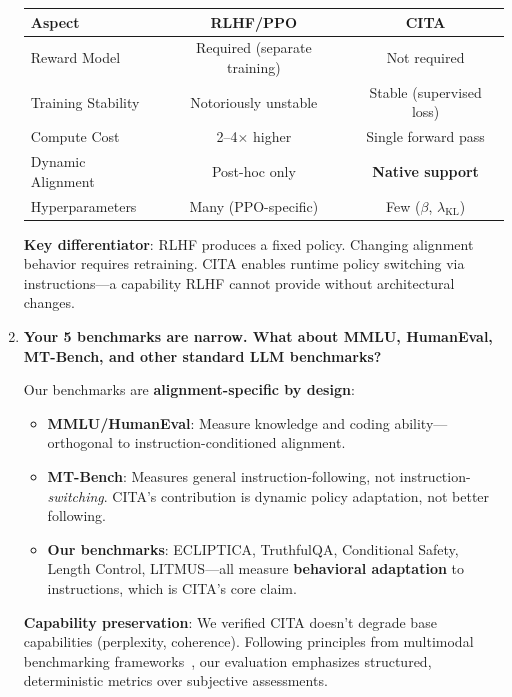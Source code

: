 \begin{enumerate}[label=\textbf{Q\arabic*.}, leftmargin=*, itemsep=8pt]
\begin{table}[ht!]
\centering
\small
\renewcommand{\arraystretch}{1.2}
\begin{tabular}{@{}lcc@{}}
\toprule
\textbf{Aspect} & \textbf{RLHF/PPO} & \textbf{CITA} \\
\midrule
Reward Model & Required (separate training) & Not required \\ \hline
Training Stability & Notoriously unstable & Stable (supervised loss) \\ \hline
Compute Cost & 2--4$\times$ higher & Single forward pass \\ \hline
Dynamic Alignment & Post-hoc only & \textbf{Native support} \\ \hline
Hyperparameters & Many (PPO-specific) & Few ($\beta$, $\lambda_{\text{KL}}$) \\
\bottomrule
\end{tabular}
\end{table}

\textbf{Key differentiator}: RLHF produces a fixed policy. Changing alignment behavior requires retraining. CITA enables runtime policy switching via instructions---a capability RLHF cannot provide without architectural changes.

\vspace{4mm}

\item \textbf{Your 5 benchmarks are narrow. What about MMLU, HumanEval, MT-Bench, and other standard LLM benchmarks?}

 Our benchmarks are \textbf{alignment-specific by design}:

\begin{itemize}[leftmargin=*,itemsep=2pt]
    \item \textbf{MMLU/HumanEval}: Measure knowledge and coding ability---orthogonal to instruction-conditioned alignment.

    \item \textbf{MT-Bench}: Measures general instruction-following, not instruction-\textit{switching}. CITA's contribution is dynamic policy adaptation, not better following.

    \item \textbf{Our benchmarks}: ECLIPTICA, TruthfulQA, Conditional Safety, Length Control, LITMUS---all measure \textbf{behavioral adaptation} to instructions, which is CITA's core claim.
\end{itemize}

\textbf{Capability preservation}: We verified CITA doesn't degrade base capabilities (perplexity, coherence). Following principles from multimodal benchmarking frameworks~\cite{wanaskar2025multimodal}, our evaluation emphasizes structured, deterministic metrics over subjective assessments.


\end{enumerate}
